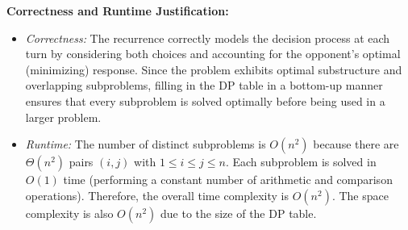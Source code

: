 \documentclass[11pt]{article}
\begin{document}
        \textbf{Correctness and Runtime Justification:}  
        \begin{itemize}
            \item \emph{Correctness:}  
            The recurrence correctly models the decision process at each turn by considering both choices and accounting for the opponent’s optimal (minimizing) response. Since the problem exhibits optimal substructure and overlapping subproblems, filling in the DP table in a bottom-up manner ensures that every subproblem is solved optimally before being used in a larger problem.
            
            \item \emph{Runtime:}  
            The number of distinct subproblems is \(O(n^2)\) because there are \(\Theta(n^2)\) pairs \((i,j)\) with \(1 \leq i \leq j \leq n\). Each subproblem is solved in \(O(1)\) time (performing a constant number of arithmetic and comparison operations). Therefore, the overall time complexity is \(O(n^2)\). The space complexity is also \(O(n^2)\) due to the size of the DP table.
        \end{itemize}

    \newpage

    
    
\end{document}
